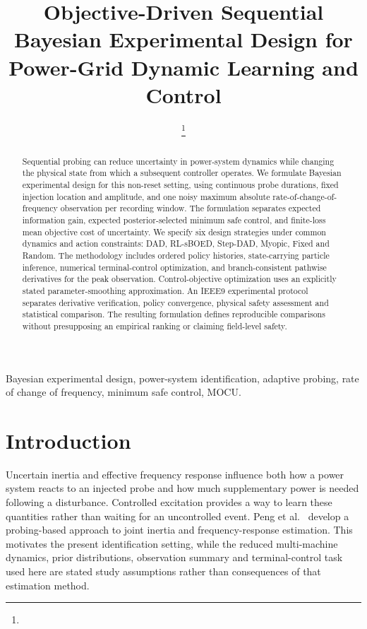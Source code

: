 \documentclass[journal]{IEEEtran}
\title{Objective-Driven Sequential Bayesian Experimental Design for
Power-Grid Dynamic Learning and Control}
\author{\todo{Authors and affiliations}%
\thanks{\todo{Funding and corresponding-author information.}}}
\begin{document}
\maketitle

\begin{abstract}
Sequential probing can reduce uncertainty in power-system dynamics while
changing the physical state from which a subsequent controller operates.
We formulate Bayesian experimental design for this non-reset setting, using
continuous probe durations, fixed injection location and amplitude, and one
noisy maximum absolute rate-of-change-of-frequency observation per recording
window. The formulation separates expected information gain, expected
posterior-selected minimum safe control, and finite-loss mean objective cost
of uncertainty. We specify six design strategies under common dynamics and
action constraints: DAD, RL-sBOED, Step-DAD, Myopic, Fixed and Random.
The methodology includes ordered policy histories, state-carrying particle
inference, numerical terminal-control optimization, and branch-consistent
pathwise derivatives for the peak observation. Control-objective optimization
uses an explicitly stated parameter-smoothing approximation. An IEEE9
experimental protocol separates derivative verification, policy convergence,
physical safety assessment and statistical comparison. The resulting formulation
defines reproducible comparisons without presupposing an empirical
ranking or claiming field-level safety.
\end{abstract}
\begin{IEEEkeywords}
Bayesian experimental design, power-system identification, adaptive probing,
rate of change of frequency, minimum safe control, MOCU.
\end{IEEEkeywords}

\section{Introduction}
\label{sec:introduction}
Uncertain inertia and effective frequency response influence both how a power
system reacts to an injected probe and how much supplementary power is needed
following a disturbance. Controlled excitation provides a way to learn these
quantities rather than waiting for an uncontrolled event. Peng et
al.~\cite{peng2024probing} develop a probing-based approach to joint inertia
and frequency-response estimation. This motivates the present identification
setting, while the reduced multi-machine dynamics, prior distributions,
observation summary and terminal-control task used here are stated study
assumptions rather than consequences of that estimation method.
\end{document}
